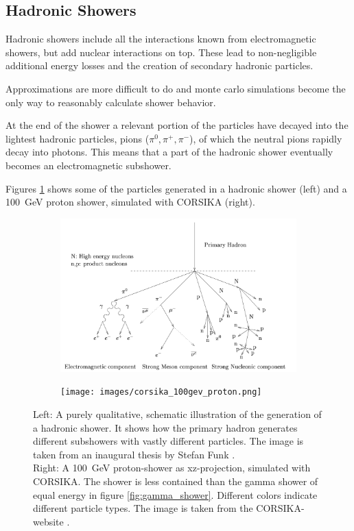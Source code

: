 \subsection{Hadronic Showers}
Hadronic showers include all the interactions known from 
electromagnetic showers, but add nuclear interactions on top.
These lead to non-negligible additional energy losses 
and the creation of secondary hadronic particles.

Approximations are more difficult to do and monte carlo simulations 
become the only way to reasonably calculate shower behavior.

At the end of the shower a relevant portion of the particles have decayed into the 
lightest hadronic particles, pions ($\pi^0, \pi^+, \pi^-$), of which the neutral pions 
rapidly decay into photons.
This means that a part of the hadronic shower
eventually becomes an electromagnetic subshower.

Figures \ref{fig:proton_shower}
shows some of the particles generated in a hadronic shower (left)
and a \SI{100}{\giga\electronvolt} proton shower, simulated with CORSIKA (right).

\begin{figure}
	\centering
	\captionsetup{width=0.9\linewidth}
	\begin{subfigure}{.7\textwidth}
  		\centering
  		\includegraphics[width=\linewidth]{images/hadron_shower_illustration.png}
	\end{subfigure}%
	\begin{subfigure}{.2\textwidth}
 		\centering
		\texttt{[image: images/corsika\_100gev\_proton.png]}
	\end{subfigure}
	\caption{
		Left: A purely qualitative,
		schematic illustration of the generation of a hadronic shower.
		It shows how the primary hadron generates different subshowers
		with vastly different particles.
		The image is taken from an inaugural thesis 
		by Stefan Funk \cite{funk_doctor}.\\
		Right: A \SI{100}{\giga\electronvolt} proton-shower as xz-projection,
		simulated with CORSIKA.
		The shower is less contained than the gamma shower of equal energy in 
		figure \ref{fig:gamma_shower}.
		Different colors indicate different particle types.
		The image is taken from 
		the CORSIKA-website \cite{corsika_showers}.}
	\label{fig:proton_shower}
\end{figure}




